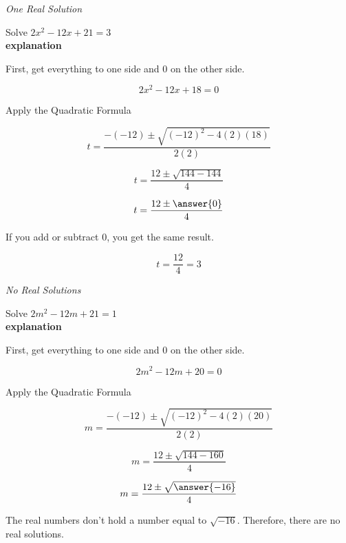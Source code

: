 \documentclass{ximera}
\begin{document}
\begin{example} \textit{One Real Solution}

Solve $2 x^2 - 12x + 21 = 3$ \\


\textbf{explanation}


First, get everything to one side and $0$ on the other side.



\[  2 x^2 - 12x + 18 = 0  \]

Apply the Quadratic Formula


\[   t = \frac{-(-12) \pm \sqrt{(-12)^2 - 4 (2) (18)}}{2 (2)}            \]



\[   t = \frac{12 \pm \sqrt{144 - 144}}{4}            \]

\[   t = \frac{12 \pm \answer{0}}{4}            \]

If you add or subtract $0$, you get the same result.

\[   t = \frac{12}{4}   = 3         \]






\end{example}








\begin{example} \textit{No Real Solutions}

Solve $2 m^2 - 12m + 21 = 1$ \\


\textbf{explanation}


First, get everything to one side and $0$ on the other side.



\[  2 m^2 - 12m + 20 = 0  \]

Apply the Quadratic Formula


\[   m = \frac{-(-12) \pm \sqrt{(-12)^2 - 4 (2) (20)}}{2 (2)}            \]

\[   m = \frac{12 \pm \sqrt{144 - 160}}{4}            \]

\[   m = \frac{12 \pm \sqrt{\answer{-16}}}{4}            \]



The real numbers don't hold a number equal to $\sqrt{-16}$.  Therefore, there are no real solutions.





\end{example}
\end{document}
